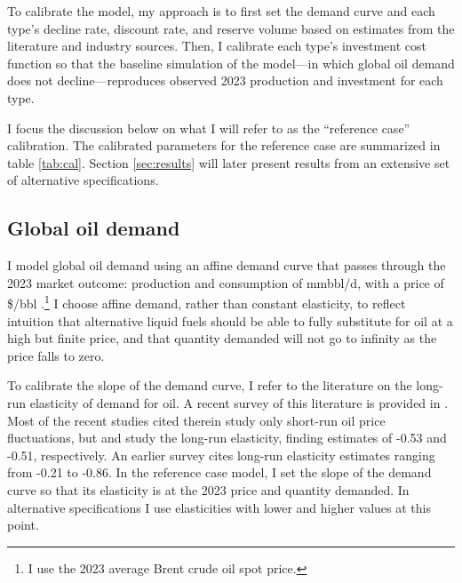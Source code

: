 \documentclass[12pt]{article}
\begin{document}
To calibrate the model, my approach is to first set the demand curve and each type's decline rate, discount rate, and reserve volume based on estimates from the literature and industry sources. Then, I calibrate each type's investment cost function so that the baseline simulation of the model---in which global oil demand does not decline---reproduces observed 2023 production and investment for each type.


I focus the discussion below on what I will refer to as the ``reference case'' calibration. The calibrated parameters for the reference case are summarized in table \ref{tab:cal}. Section \ref{sec:results} will later present results from an extensive set of alternative specifications.


\subsection{Global oil demand} \label{sec:cal_dem}

I model global oil demand using an affine demand curve that passes through the 2023 market outcome: production and consumption of mmbbl/d, with a price of \$\unskip/bbl \citep{EIAspotprices}.\footnote{I use the 2023 average Brent crude oil spot price.} I choose affine demand, rather than constant elasticity, to reflect intuition that alternative liquid fuels should be able to fully substitute for oil at a high but finite price, and that quantity demanded will not go to infinity as the price falls to zero.

To calibrate the slope of the demand curve, I refer to the literature on the long-run elasticity of demand for oil. A recent survey of this literature is provided in \cite{prestetal2024}. Most of the recent studies cited therein study only short-run oil price fluctuations, but \cite{krupnicketal2017} and \cite{balkebrown2018} study the long-run elasticity, finding estimates of -0.53 and -0.51, respectively. An earlier survey \citep{hamilton2009} cites long-run elasticity estimates ranging from -0.21 to -0.86. In the reference case model, I set the slope of the demand curve so that its elasticity is at the 2023 price and quantity demanded. In alternative specifications I use elasticities with lower and higher values at this point.
\end{document}

